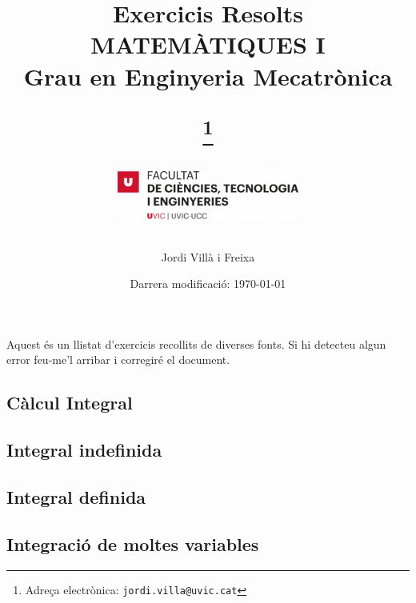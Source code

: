 \documentclass[12pt]{article}
\begin{document}


\title{Exercicis Resolts \\ \large MATEMÀTIQUES I \\ Grau en Enginyeria Mecatrònica 
\author{Jordi Villà i Freixa}\thanks{Adreça electrònica: \texttt{jordi.villa@uvic.cat}}
\begin{center}\includegraphics[width = 60mm]{FCTE}\end{center}}
\date{Darrera modificació: \today}
\maketitle

\tableofcontents
\newpage

Aquest és un llistat d'exercicis recollits de diverses fonts. Si hi detecteu algun error feu-me'l arribar i corregiré el document.
%
\begin{ExerciseList}
\section{Càlcul Integral}

\subsection{Integral indefinida}









\subsection{Integral definida}




\subsection{Integració de moltes variables}




\end{ExerciseList}
\end{document}
